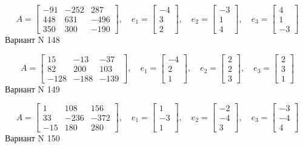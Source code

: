 \documentclass[11pt]{report}
\begin{document}
$$A = \left[\begin{matrix}-91 & -252 & 287\\448 & 631 & -496\\350 & 300 & -190\end{matrix}\right],\quad e_1 = \left[\begin{matrix}-4\\3\\2\end{matrix}\right],\quad e_2 = \left[\begin{matrix}-3\\1\\4\end{matrix}\right],\quad e_3 = \left[\begin{matrix}4\\1\\-3\end{matrix}\right]$$Вариант N 148

$$A = \left[\begin{matrix}15 & -13 & -37\\82 & 200 & 103\\-128 & -188 & -139\end{matrix}\right],\quad e_1 = \left[\begin{matrix}-4\\2\\1\end{matrix}\right],\quad e_2 = \left[\begin{matrix}2\\2\\3\end{matrix}\right],\quad e_3 = \left[\begin{matrix}2\\3\\1\end{matrix}\right]$$Вариант N 149

$$A = \left[\begin{matrix}1 & 108 & 156\\33 & -236 & -372\\-15 & 180 & 280\end{matrix}\right],\quad e_1 = \left[\begin{matrix}1\\-3\\1\end{matrix}\right],\quad e_2 = \left[\begin{matrix}-2\\-4\\3\end{matrix}\right],\quad e_3 = \left[\begin{matrix}-3\\-4\\4\end{matrix}\right]$$Вариант N 150
\end{document}
